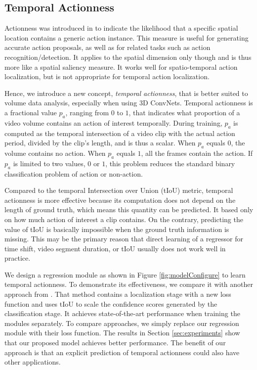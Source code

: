 \documentclass[10pt,twocolumn,letterpaper]{article}
\begin{document}
\subsection{Temporal Actionness}
Actionness was introduced in \cite{actionness_cvpr14_chen} to indicate the likelihood that a specific spatial location contains a generic action instance. This measure is useful for generating accurate action proposals, as well as for related tasks such as action recognition/detection. It applies to the spatial dimension only though and is thus more like a spatial saliency measure. It works well for spatio-temporal action localization, but is not appropriate for temporal action localization.

Hence, we introduce a new concept, \textit{temporal actionness}, that is better suited to volume data analysis, especially when using 3D ConvNets. Temporal actionness is a fractional value $p_{a}$, ranging from $0$ to $1$, that indicates what proportion of a video volume contains an action of interest temporally. During training, $p_{a}$ is computed as the temporal intersection of a video clip with the actual action period, divided by the clip's length, and is thus a scalar. When $p_{a}$ equals $0$, the volume contains no action. When $p_{a}$ equals $1$, all the frames contain the action. If $p_{a}$ is limited to two values, $0$ or $1$, this problem reduces the standard binary classification problem of action or non-action. 

Compared to the temporal Intersection over Union (tIoU) metric, temporal actionness is more effective because its computation does not depend on the length of ground truth, which means this quantity can be predicted. It based only on how much action of interest a clip contains. On the contrary, predicting the value of tIoU is basically impossible when the ground truth information is missing. 
This may be the primary reason that direct learning of a regressor for time shift, video segment duration, or tIoU usually does not work well in practice.

We design a regression module as shown in Figure \ref{fig:modelConfigure} to learn temporal actionness. 
To demonstrate its effectiveness, we compare it with another approach from \cite{scnn_shou_wang_chang_cvpr16}. That method contains a localization stage with a new loss function and uses tIoU to scale the confidence scores generated by the classification stage. It achieves state-of-the-art performance when training the modules separately. To compare approaches, we simply replace our regression module with their loss function. The results in Section \ref{sec:experiments} show that our proposed model achieves better performance. The benefit of our approach is that an explicit prediction of temporal actionness could also have other applications.
\end{document}
